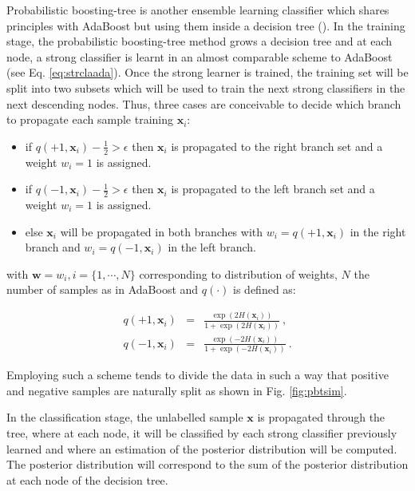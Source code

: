 \begin{enumerate}[leftmargin=*]
Probabilistic boosting-tree is another ensemble learning classifier which shares principles with AdaBoost but using them inside a decision tree (\cite{Tu2005}). In the training stage, the probabilistic boosting-tree method grows a decision tree and at each node, a strong classifier is learnt in an almost comparable scheme to AdaBoost (see Eq. \ref{eq:strclaada}). Once the strong learner is trained, the training set will be split into two subsets which will be used to train the next strong classifiers in the next descending nodes. Thus, three cases are conceivable to decide which branch to propagate each sample training $\mathbf{x}_i$:

\begin{itemize}
	\item if $q(+1, \mathbf{x}_i) - \frac{1}{2} > \epsilon$ then $\mathbf{x}_i$ is propagated to the right branch set and a weight $w_i=1$ is assigned. 
	\item if $q(-1, \mathbf{x}_i) - \frac{1}{2} > \epsilon$ then $\mathbf{x}_i$ is propagated to the left branch set and a weight $w_i=1$ is assigned.
	\item else $\mathbf{x}_i$ will be propagated in both branches with $w_i=q(+1, \mathbf{x}_i)$ in the right branch and $w_i=q(-1, \mathbf{x}_i)$ in the left branch.
\end{itemize}

\noindent with $\mathbf{w} = w_i, i=\{1,\cdots,N\}$ corresponding to distribution of weights, $N$ the number of samples as in AdaBoost and $q(\cdot)$ is defined as:

\begin{eqnarray}
	q(+1, \mathbf{x}_i) & = & \frac{\exp(2H(\mathbf{x}_i))}{1+\exp(2H(\mathbf{x}_i))} \ , \label{eq:regada1} \\
	q(-1, \mathbf{x}_i) & = & \frac{\exp(-2H(\mathbf{x}_i))}{1+\exp(-2H(\mathbf{x}_i))} \ . \label{eq:regada2}
\end{eqnarray}

Employing such a scheme tends to divide the data in such a way that positive and negative samples are naturally split as shown in Fig. \ref{fig:pbtsim}.

In the classification stage, the unlabelled sample $\mathbf{x}$ is propagated through the tree, where at each node, it will be classified by each strong classifier previously learned and where an estimation of the posterior distribution will be computed. The posterior distribution will correspond to the sum of the posterior distribution at each node of the decision tree.


\end{enumerate}

